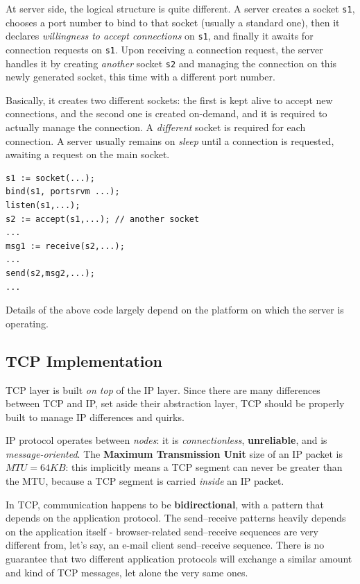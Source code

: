 \documentclass[10pt]{extbook}
\begin{document}
At server side, the logical structure is quite different. A server creates
a socket \texttt{s1}, chooses a port number to bind to that socket (usually a
standard one), then it declares \emph{willingness to accept connections} on
\texttt{s1}, and finally it awaits for connection requests on \texttt{s1}. Upon
receiving a connection request, the server handles it by creating
\emph{another} socket \texttt{s2} and managing the connection on this newly
generated socket, this time with a different port number. 

Basically, it creates two different sockets: the first is kept alive to accept
new connections, and the second one is created on-demand, and it is required to
actually manage the connection. A \emph{different} socket is required for each
connection. A server usually remains on \emph{sleep} until a connection is
requested, awaiting a request on the main socket.

\begin{verbatim} 
s1 := socket(...);
bind(s1, portsrvm ...);
listen(s1,...);
s2 := accept(s1,...); // another socket
... 
msg1 := receive(s2,...);
...
send(s2,msg2,...);
... 
\end{verbatim}

Details of the above code largely depend on the platform on which the server is
operating.

\subsection{TCP Implementation}

TCP layer is built \emph{on top} of the IP layer. Since there are many differences
between TCP and IP, set aside their abstraction layer, TCP should be properly
built to manage IP differences and quirks. 

IP protocol operates between \emph{nodes}: it is \emph{connectionless},
\textbf{unreliable}, and is \emph{message-oriented}. The \textbf{Maximum
Transmission Unit} size of an IP packet is $MTU = 64KB$: this implicitly means
a TCP segment can never be greater than the MTU, because a TCP segment is
carried \emph{inside} an IP packet.

In TCP, communication happens to be \textbf{bidirectional}, with a pattern that
depends on the application protocol. The send\---receive patterns heavily depends
on the application itself \-- browser-related send\---receive sequences are
very different from, let's say, an e-mail client send\---receive sequence.
There is no guarantee that two different application protocols will exchange a
similar amount and kind of TCP messages, let alone the very same ones.
\end{document}
